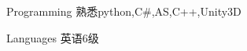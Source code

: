 


\begin{cvskills}


\cvskill
{Programming} %
{熟悉python,C\#,AS,C++,Unity3D} %




\cvskill
{Languages} %
{英语6级} %


\end{cvskills}